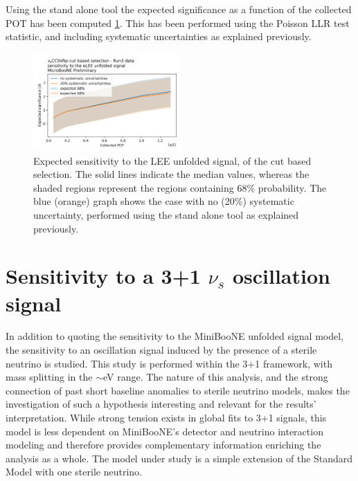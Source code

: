Using the stand alone tool the expected significance as a function of the collected POT has been computed \ref{fig:sensitivity_function_pot}.
This has been performed using the Poisson LLR test statistic, and including systematic uncertainties as explained previously.

\begin{figure}[H]
    \begin{center}
    \includegraphics[width=0.5\textwidth]{Sensitivity/sensitivity_vs_pot.png}
    \caption{Expected sensitivity to the LEE unfolded signal, of the \nueccnopinp cut based selection. The solid lines indicate the median values, whereas the shaded regions represent the regions containing 68\% probability.
    The blue (orange) graph shows the case with no (20\%) systematic uncertainty, performed using the stand alone tool as explained previously.
    }
    \label{fig:sensitivity_function_pot}
    \end{center}
\end{figure}

\section{Sensitivity to a 3+1 $\nu_s$ oscillation signal }
In addition to quoting the sensitivity to the MiniBooNE unfolded signal model, the sensitivity to an oscillation signal induced by the presence of a sterile neutrino is studied.
This study is performed within the 3+1 framework, with mass splitting in the $\sim$eV range.
The nature of this analysis, and the strong connection of past short baseline anomalies to sterile neutrino models, makes the investigation of such a hypothesis interesting and relevant for the results' interpretation.
While strong tension exists in global fits to 3+1 signals, this model is less dependent on MiniBooNE's detector and neutrino interaction modeling and therefore provides complementary information enriching the analysis as a whole.
The model under study is a simple extension of the Standard Model with one sterile neutrino.


